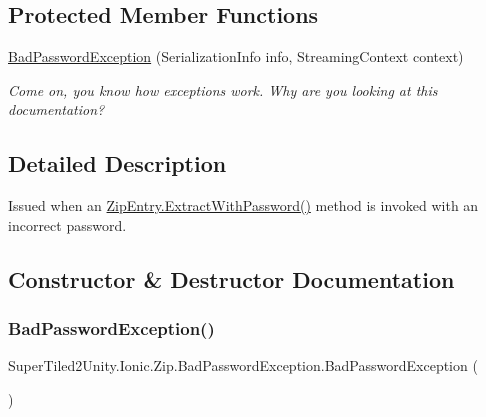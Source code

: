 \subsection*{Protected Member Functions}
\begin{DoxyCompactItemize}
\item 
\mbox{\hyperlink{class_super_tiled2_unity_1_1_ionic_1_1_zip_1_1_bad_password_exception_aaa51886dc5758de5326b3d9fe423de04}{Bad\+Password\+Exception}} (Serialization\+Info info, Streaming\+Context context)
\begin{DoxyCompactList}\small\item\em Come on, you know how exceptions work. Why are you looking at this documentation? \end{DoxyCompactList}\end{DoxyCompactItemize}


\subsection{Detailed Description}
Issued when an {\ttfamily \mbox{\hyperlink{class_super_tiled2_unity_1_1_ionic_1_1_zip_1_1_zip_entry_a346d1d4eaf4ccb1274fe31629f3cb429}{Zip\+Entry.\+Extract\+With\+Password()}}} method is invoked with an incorrect password. 



\subsection{Constructor \& Destructor Documentation}
\mbox{\label{class_super_tiled2_unity_1_1_ionic_1_1_zip_1_1_bad_password_exception_ae0f2e1ae0b7fe3c663fc273395cdd49c}} 
\subsubsection{\texorpdfstring{Bad\+Password\+Exception()}{BadPasswordException()}\hspace{0.1cm}{\footnotesize\ttfamily [1/4]}}
{\footnotesize\ttfamily Super\+Tiled2\+Unity.\+Ionic.\+Zip.\+Bad\+Password\+Exception.\+Bad\+Password\+Exception (\begin{DoxyParamCaption}{ }\end{DoxyParamCaption})}



